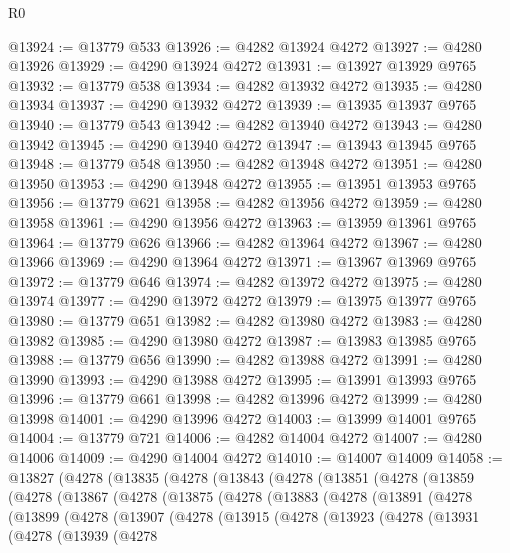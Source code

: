 \begin{lexlean}{R0}
\begin{coremodule}
@13924 := @13779 @533
@13926 := @4282 @13924 @4272
@13927 := @4280 @13926
@13929 := @4290 @13924 @4272
@13931 := @13927 @13929 @9765
@13932 := @13779 @538
@13934 := @4282 @13932 @4272
@13935 := @4280 @13934
@13937 := @4290 @13932 @4272
@13939 := @13935 @13937 @9765
@13940 := @13779 @543
@13942 := @4282 @13940 @4272
@13943 := @4280 @13942
@13945 := @4290 @13940 @4272
@13947 := @13943 @13945 @9765
@13948 := @13779 @548
@13950 := @4282 @13948 @4272
@13951 := @4280 @13950
@13953 := @4290 @13948 @4272
@13955 := @13951 @13953 @9765
@13956 := @13779 @621
@13958 := @4282 @13956 @4272
@13959 := @4280 @13958
@13961 := @4290 @13956 @4272
@13963 := @13959 @13961 @9765
@13964 := @13779 @626
@13966 := @4282 @13964 @4272
@13967 := @4280 @13966
@13969 := @4290 @13964 @4272
@13971 := @13967 @13969 @9765
@13972 := @13779 @646
@13974 := @4282 @13972 @4272
@13975 := @4280 @13974
@13977 := @4290 @13972 @4272
@13979 := @13975 @13977 @9765
@13980 := @13779 @651
@13982 := @4282 @13980 @4272
@13983 := @4280 @13982
@13985 := @4290 @13980 @4272
@13987 := @13983 @13985 @9765
@13988 := @13779 @656
@13990 := @4282 @13988 @4272
@13991 := @4280 @13990
@13993 := @4290 @13988 @4272
@13995 := @13991 @13993 @9765
@13996 := @13779 @661
@13998 := @4282 @13996 @4272
@13999 := @4280 @13998
@14001 := @4290 @13996 @4272
@14003 := @13999 @14001 @9765
@14004 := @13779 @721
@14006 := @4282 @14004 @4272
@14007 := @4280 @14006
@14009 := @4290 @14004 @4272
@14010 := @14007 @14009
@14058 := @13827
    (@4278
      (@13835
        (@4278
          (@13843
            (@4278
              (@13851
                (@4278
                  (@13859
                    (@4278
                      (@13867
                        (@4278
                          (@13875
                            (@4278
                              (@13883
                                (@4278
                                  (@13891
                                    (@4278
                                      (@13899
                                        (@4278
                                          (@13907
                                            (@4278
                                              (@13915
                                                (@4278
                                                  (@13923
                                                    (@4278
                                                      (@13931
                                                        (@4278
                                                          (@13939
                                                            (@4278

\end{coremodule}
\end{lexlean}
